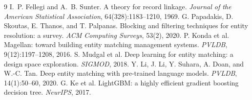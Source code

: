 \documentclass[10pt]{article}
\begin{document}
\begin{thebibliography}{9}\small
{} I.~P. Fellegi and A.~B. Sunter. A theory for record linkage. \emph{Journal of the American Statistical Association}, 64(328):1183--1210, 1969.
 G. Papadakis, D. Skoutas, E. Thanos, and T. Palpanas. Blocking and filtering techniques for entity resolution: a survey. \emph{ACM Computing Surveys}, 53(2), 2020.
 P. Konda et al. Magellan: toward building entity matching management systems. \emph{PVLDB}, 9(12):1197--1208, 2016.
 S. Mudgal et al. Deep learning for entity matching: a design space exploration. \emph{SIGMOD}, 2018.
 Y. Li, J. Li, Y. Suhara, A. Doan, and W.-C. Tan. Deep entity matching with pre-trained language models. \emph{PVLDB}, 14(1):50--60, 2020.
 G. Ke et al. LightGBM: a highly efficient gradient boosting decision tree. \emph{NeurIPS}, 2017.
\end{thebibliography}
\end{document}

